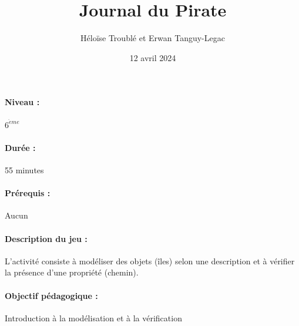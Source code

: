 \documentclass[12pt, a4paper]{article}
\begin{document}
	
	\title{Journal du Pirate}
	\author{Héloïse Troublé et Erwan Tanguy-Legac}
	\date{12 avril 2024}
	\maketitle
	
	\paragraph*{Niveau :} $6^{\grave{e}me}$
	\paragraph*{Durée :} 55 minutes
	\paragraph*{Prérequis :} Aucun
	\paragraph*{Description du jeu :}
    L'activité consiste à modéliser des objets (îles) selon une description et à vérifier la présence d'une propriété (chemin).
	\paragraph*{Objectif pédagogique :}
    Introduction à la modélisation et à la vérification
\end{document}
